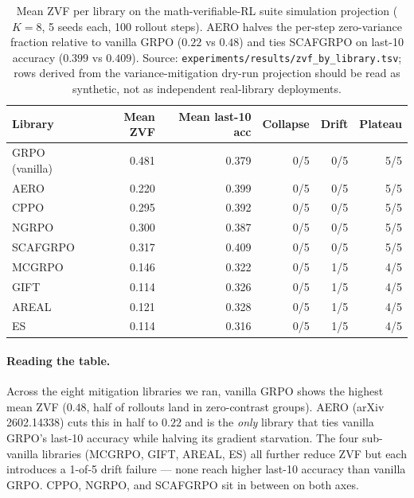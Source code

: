 \documentclass{article}
\begin{document}
\begin{table}[htbp]
\centering
\small
\setlength{\tabcolsep}{4pt}
\begin{tabular}{lrrrrr}
\hline
Library          & Mean ZVF & Mean last-10 acc & Collapse & Drift & Plateau \\
\hline
GRPO (vanilla)   & 0.481    & 0.379  & 0/5 & 0/5 & 5/5 \\
AERO             & 0.220    & 0.399  & 0/5 & 0/5 & 5/5 \\
CPPO             & 0.295    & 0.392  & 0/5 & 0/5 & 5/5 \\
NGRPO            & 0.300    & 0.387  & 0/5 & 0/5 & 5/5 \\
SCAFGRPO         & 0.317    & 0.409  & 0/5 & 0/5 & 5/5 \\
MCGRPO           & 0.146    & 0.322  & 0/5 & 1/5 & 4/5 \\
GIFT             & 0.114    & 0.326  & 0/5 & 1/5 & 4/5 \\
AREAL            & 0.121    & 0.328  & 0/5 & 1/5 & 4/5 \\
ES               & 0.114    & 0.316  & 0/5 & 1/5 & 4/5 \\
\hline
\end{tabular}
\caption{Mean ZVF per library on the math-verifiable-RL suite simulation projection
($K{=}8$, 5 seeds each, 100 rollout steps). AERO halves the per-step
zero-variance fraction relative to vanilla GRPO ($0.22$ vs $0.48$)
and ties SCAFGRPO on last-10 accuracy ($0.399$ vs $0.409$).
Source: \texttt{experiments/results/zvf_by_library.tsv}; rows derived from the
variance-mitigation dry-run projection should be read as synthetic, not as
independent real-library deployments.}
\label{tab:zvf-by-library}
\end{table}

\paragraph{Reading the table.}
Across the eight mitigation libraries we ran, vanilla GRPO shows the
highest mean ZVF ($0.48$, half of rollouts land in zero-contrast groups).
AERO (arXiv 2602.14338) cuts this in half to $0.22$ and is the
\emph{only} library that ties vanilla GRPO's last-10 accuracy while
halving its gradient starvation. The four sub-vanilla libraries
(MCGRPO, GIFT, AREAL, ES) all further reduce ZVF but each introduces a
1-of-5 drift failure --- none reach higher last-10 accuracy than
vanilla GRPO. CPPO, NGRPO, and SCAFGRPO sit in between on both axes.
\end{document}
